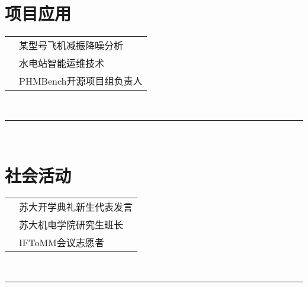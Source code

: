 \documentclass[oneside]{article}
\begin{document}
{\begin{minipage}[t][\dimexpr\textheight-2\fboxrule-2\fboxsep\relax][t]{\dimexpr0.4\textwidth-2\fboxrule-2\fboxsep\relax}
        \section*{\large 项目应用}
        \begin{tabularx}{\textwidth}{cY}
            \faPlane{}      & 某型号飞机减振降噪分析 \\
            \faBolt{}       & 水电站智能运维技术 \\
            \faGithub{}     & PHMBench开源项目组负责人 \\
        \end{tabularx}
        \vspace{.3cm}
        \\
        \rule{\linewidth}{0.4pt}
        \\
        \section*{\large 社会活动}
        \begin{tabularx}{\textwidth}{cY}
            \faMicrophone{}  & 苏大开学典礼新生代表发言 \\
            \faUserTie{}     & 苏大机电学院研究生班长 \\
            \faHandsHelping{} & IFToMM会议志愿者 \\
        \end{tabularx}
        \vspace{.3cm}
        \\
        \rule{\linewidth}{0.4pt}
    \end{minipage}%
}%
\end{document}
